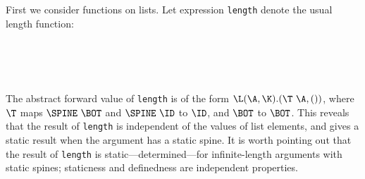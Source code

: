 \begin{article}
First we consider functions on lists.
Let expression \mbox{\tt length} denote the usual length function:
\begin{flushleft}
\vspace{-0.0em}\vspace{-0.0em}\\
\vspace{-0.0em}\\
\vspace{-0.0em}\\
\vspace{-0.0em}
\end{flushleft}
The abstract forward value of \mbox{\tt length} is of the form
$\L(\A,\K).(\T~\A,())$, where $\T$ maps $\SPINE~\BOT$ and $\SPINE~\ID$
to $\ID$, and $\BOT$ to $\BOT$.  This reveals that the result of
\mbox{\tt length} is independent of the values of list elements, and gives
a static result when the argument has a static spine.  It is worth
pointing out that the result of \mbox{\tt length} is static---determined---for
infinite-length arguments with static spines; staticness and definedness
are independent properties.



\end{article}

